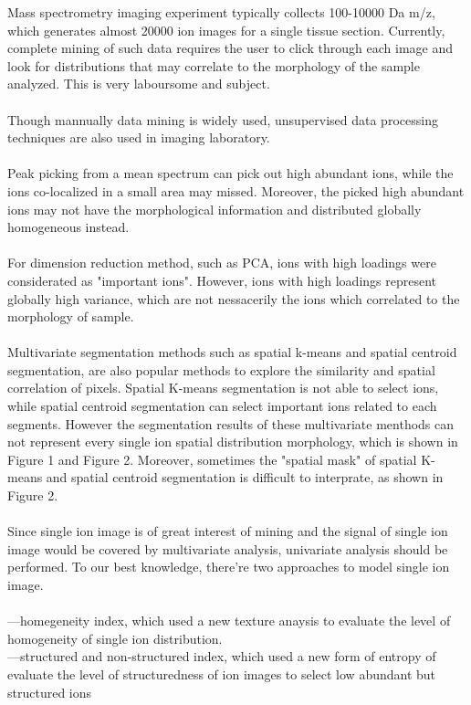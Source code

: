 \documentclass{bioinfo}
\begin{document}
Mass spectrometry imaging experiment typically collects 100-10000 Da m/z, which generates almost 20000 ion images for a single tissue section. Currently, complete mining of such data requires the user to click through each image and look for distributions that may correlate to the morphology of the sample analyzed. This is very laboursome and subject. \\
\\
Though mannually data mining is widely used, unsupervised data processing techniques are also used in imaging laboratory. \\
\\
Peak picking from a mean spectrum can pick out high abundant ions, while the ions co-localized in a small area may missed. Moreover, the picked high abundant ions may not have the morphological information and distributed globally homogeneous instead.\\
\\
For dimension reduction method, such as PCA, ions with high loadings were considerated as "important ions". However, ions with high loadings represent globally high variance, which are not nessacerily the ions which correlated to the morphology of sample.\\
\\
Multivariate segmentation methods such as spatial k-means and spatial centroid segmentation, are also popular methods to explore the similarity and spatial correlation of pixels. Spatial K-means segmentation is not able to select ions, while spatial centroid segmentation can select important ions related to each segments. However the segmentation results of these multivariate menthods can not represent every single ion spatial distribution morphology, which is shown in Figure 1 and Figure 2. Moreover, sometimes the "spatial mask" of spatial K-means and spatial centroid segmentation is difficult to interprate, as shown in Figure 2.\\
\\  

Since single ion image is of great interest of mining and the signal of single ion image would be covered by multivariate analysis,  univariate analysis should be performed. To our best knowledge, there're two approaches to model single ion image. \\
\\ 

---homegeneity index, which used a new texture anaysis to evaluate the level of homogeneity of single ion distribution.\\
---structured and non-structured index, which used a new form of entropy of evaluate the level of structuredness of ion images to select low abundant but structured ions\\
\end{document}
